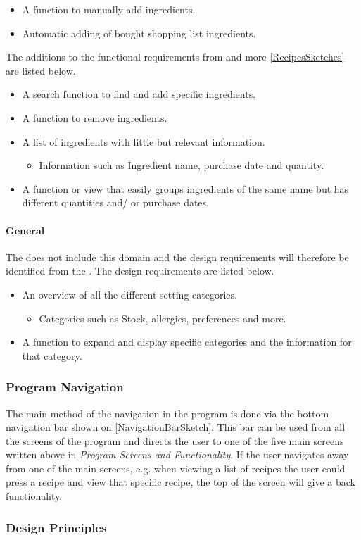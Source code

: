 \begin{itemize}
	\item A function to manually add ingredients.
	\item Automatic adding of bought shopping list ingredients.
\end{itemize}

The additions to the functional requirements from  and more \cref{RecipesSketches} are listed below.

\begin{itemize}
	\item A search function to find and add specific ingredients.
	\item A function to remove ingredients.
	\item A list of ingredients with little but relevant information.
		\begin{itemize}
			\item Information such as Ingredient name, purchase date and quantity.
		\end{itemize}
	\item A function or view that easily groups ingredients of the same name but has different quantities and/ or purchase dates.
\end{itemize}  

\paragraph{General}   
The  does not include this domain and the design requirements will therefore be identified from the . The design requirements are listed below.

\begin{itemize}
	\item An overview of all the different setting categories.
		\begin{itemize}
			\item Categories such as Stock, allergies, preferences and more.
		\end{itemize}
	\item A function to expand and display specific categories and the information for that category.
\end{itemize} 
 
\subsubsection{Program Navigation}
The main method of the navigation in the program is done via the bottom navigation bar shown on \cref{NavigationBarSketch}. This bar can be used from all the screens of the program and directs the user to one of the five main screens written above in \textit{Program Screens and Functionality}. If the user navigates away from one of the main screens, e.g. when viewing a list of recipes the user could press a recipe and view that specific recipe, the top of the screen will give a back functionality. 

\subsubsection{Design Principles}

